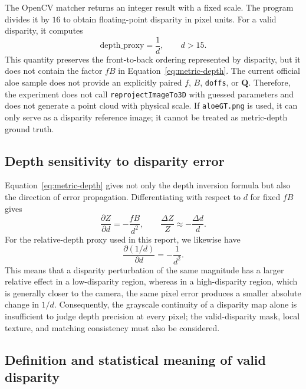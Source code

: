 The OpenCV matcher returns an integer result with a fixed scale. The program divides it by $16$ to obtain floating-point disparity in pixel units. For a valid disparity, it computes
\begin{equation}
  \mathrm{depth\_proxy}=\frac{1}{d},\qquad d>15.
  \label{eq:proxy-depth}
\end{equation}
This quantity preserves the front-to-back ordering represented by disparity, but it does not contain the factor $fB$ in Equation~\eqref{eq:metric-depth}. The current official aloe sample does not provide an explicitly paired $f$, $B$, \texttt{doffs}, or $\mathbf{Q}$. Therefore, the experiment does not call \texttt{reprojectImageTo3D} with guessed parameters and does not generate a point cloud with physical scale. If \texttt{aloeGT.png} is used, it can only serve as a disparity reference image; it cannot be treated as metric-depth ground truth.

\subsection{Depth sensitivity to disparity error}

Equation~\eqref{eq:metric-depth} gives not only the depth inversion formula but also the direction of error propagation. Differentiating with respect to $d$ for fixed $fB$ gives
\begin{equation}
  \frac{\partial Z}{\partial d}=-\frac{fB}{d^2},\qquad
  \frac{\Delta Z}{Z}\approx-\frac{\Delta d}{d}.
  \label{eq:depth-sensitivity}
\end{equation}
For the relative-depth proxy used in this report, we likewise have
\begin{equation}
  \frac{\partial (1/d)}{\partial d}=-\frac{1}{d^2}.
\end{equation}
This means that a disparity perturbation of the same magnitude has a larger relative effect in a low-disparity region, whereas in a high-disparity region, which is generally closer to the camera, the same pixel error produces a smaller absolute change in $1/d$. Consequently, the grayscale continuity of a disparity map alone is insufficient to judge depth precision at every pixel; the valid-disparity mask, local texture, and matching consistency must also be considered.

\subsection{Definition and statistical meaning of valid disparity}

